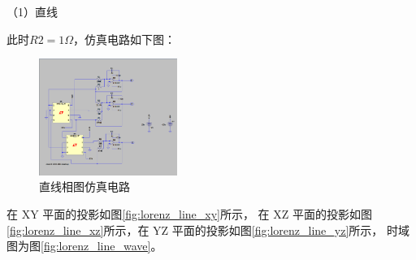 \documentclass[10pt,a4paper,twoside,UTF8]{ctexart}
\begin{document}
（1）直线

此时$R2=1\Omega$，仿真电路如下图：
\begin{figure}[H]
	\centering
	\includegraphics[width=0.4\textwidth]{fig/lo_line_cir.png}
	\caption{直线相图仿真电路}
\end{figure}

在 XY 平面的投影如图\ref{fig:lorenz_line_xy}所示，
在 XZ 平面的投影如图\ref{fig:lorenz_line_xz}所示，在 YZ 平面的投影如图\ref{fig:lorenz_line_yz}所示，
时域图为图\ref{fig:lorenz_line_wave}。
\end{document}
